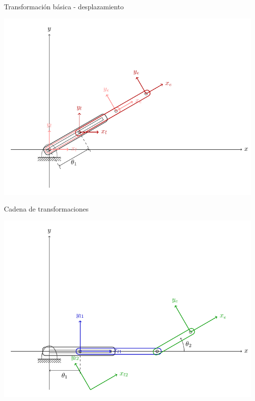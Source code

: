 \documentclass[presentation,aspectratio=169]{beamer}
\begin{document}
\begin{frame}[label={sec:org2324092}]{Transformación básica - desplazamiento}
\begin{center}
 \includegraphics[height=0.8\textheight]{../figures/2d-prismatic.pdf}
\end{center}
\end{frame}
\begin{frame}[label={sec:orgc7ebef5}]{Cadena de transformaciones}
\begin{center}
 \includegraphics[height=0.8\textheight]{../figures/2d-2dof-prismatic-revolute.pdf}
\end{center}
\end{frame}
\end{document}
